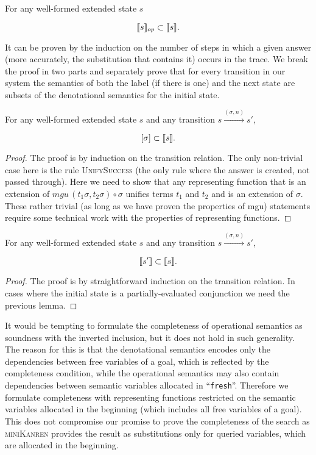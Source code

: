 \begin{lemma}
\label{GenSoundnessLemma}
For any well-formed extended state $s$

\[
\llbracket{s}\rrbracket_{op} \subset \llbracket{s}\rrbracket.
\]
\end{lemma}

It can be proven by the induction on the number of steps in which a given answer (more accurately, the substitution that contains it) occurs in the trace.
We break the proof in two parts and separately prove that for every transition in our system the semantics of both the label (if there is one)
and the next state are subsets of the denotational semantics for the initial state.

\begin{lemma}
\label{AnswerSoundnessLemma}
For any well-formed extended state $s$ and any transition $s \xrightarrow{(\sigma, n)} s'$,

\[
[\sigma] \subset \llbracket{s}\rrbracket.
\]
\end{lemma}
\begin{proof}
  The proof is by induction on the transition relation. The only non-trivial case here is the rule \textsc{UnifySuccess} (the only rule where the answer is created, not passed through).
  Here we need to show that any representing function that is an extension of $mgu\,(t_1 \sigma, t_2 \sigma) \circ \sigma$ unifies terms $t_1$ and $t_2$ and is an extension of $\sigma$.
  These rather trivial (as long as we have proven the properties of mgu) statements require some technical work with the properties of representing functions.
\end{proof}

\begin{lemma}
\label{NextStateSoundnessLemma}
For any well-formed extended state $s$ and any transition $s \xrightarrow{(\sigma, n)} s'$,

\[
\llbracket{s'}\rrbracket \subset \llbracket{s}\rrbracket.
\]
\end{lemma}
\begin{proof}
The proof is by straightforward induction on the transition relation. In cases where the initial state is a partially-evaluated conjunction we need the previous lemma.
\end{proof}

It would be tempting to formulate the completeness of operational semantics as soundness with the inverted inclusion, but it does not hold in such generality.
The reason for this is that the denotational semantics encodes only the dependencies between free variables of a goal, which is reflected by the completeness condition,
while the operational semantics may also contain dependencies between semantic variables allocated in ``\lstinline|fresh|''. Therefore we formulate completeness
with representing functions restricted on the semantic variables allocated in the beginning (which includes all free variables of a goal). This does not
compromise our promise to prove the completeness of the search as \textsc{miniKanren} provides the result as substitutions only for queried variables,
which are allocated in the beginning.

